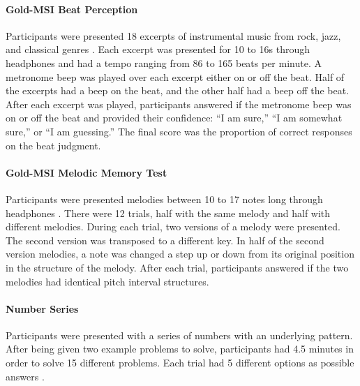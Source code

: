 \documentclass[12pt,]{book}
\let\oldparagraph\paragraph
\renewcommand{\paragraph}[1]{\oldparagraph{#1}\mbox{}}
\begin{document}
\hypertarget{gold-msi-beat-perception}{%
\paragraph{Gold-MSI Beat Perception}\label{gold-msi-beat-perception}}

Participants were presented 18 excerpts of instrumental music from rock, jazz, and classical genres \citep{mullensiefenMusicalityNonMusiciansIndex2014}.
Each excerpt was presented for 10 to 16s through headphones and had a tempo ranging from 86 to 165 beats per
minute.
A metronome beep was played over each excerpt either on or off the beat.
Half of the excerpts had a beep on the beat, and the other half had a beep off the beat.
After each excerpt was played, participants answered if the metronome beep was on or off the beat and provided their confidence: ``I am sure,'' ``I am somewhat sure,'' or ``I am guessing.''
The final score was the proportion of correct responses on the beat judgment.

\hypertarget{gold-msi-melodic-memory-test}{%
\paragraph{Gold-MSI Melodic Memory Test}\label{gold-msi-melodic-memory-test}}

Participants were presented melodies between 10 to 17 notes long through headphones \citep{mullensiefenMusicalityNonMusiciansIndex2014}.
There were 12 trials, half with the same melody and half with different melodies.
During each trial, two versions of a melody were presented.
The second version was transposed to a different key.
In half of the second version melodies, a note was changed a step up or down from its original position in the structure of the melody.
After each trial, participants answered if the two melodies had identical pitch interval structures.

\hypertarget{number-series}{%
\paragraph{Number Series}\label{number-series}}

Participants were presented with a series of numbers with
an underlying pattern.
After being given two example problems to solve, participants had 4.5 minutes in order to solve 15 different problems.
Each trial had 5 different options as possible answers \citep{thurstonePrimaryMentalAbilities1938}.
\end{document}
